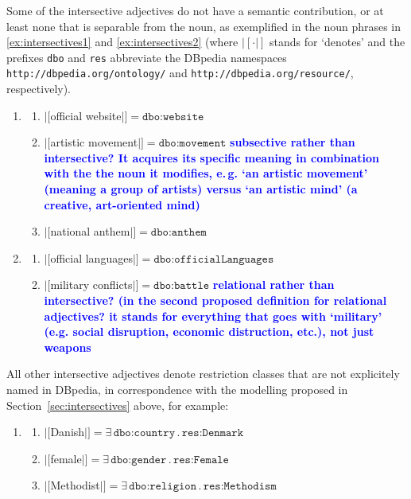 \documentclass[11pt]{article}
\begin{document}
{Some of the intersective adjectives do not have a semantic contribution, or at least none that is separable from the noun, 
as exemplified in the noun phrases in \ref{ex:intersectives1} and \ref{ex:intersectives2} (where $|[\cdot|]$ stands for 
`denotes' and the prefixes \texttt{dbo} and \texttt{res} abbreviate the DBpedia namespaces \texttt{http://dbpedia.org/ontology/} 
and \texttt{http://dbpedia.org/resource/}, respectively).
\begin{enumerate}[resume]
\item \begin{enumerate}
 \item $|[$official website$|]=\texttt{dbo:website}$
 \item $|[$artistic movement$|]=\texttt{dbo:movement}$ \textbf{\textcolor{blue}{subsective rather than intersective? It acquires its specific meaning in combination with the the noun it modifies, e.\,g. `an artistic movement' (meaning a group of artists) versus `an artistic mind' (a creative, art-oriented mind)}}
 \item $|[$national anthem$|]=\texttt{dbo:anthem}$
 \end{enumerate}
 \label{ex:intersectives1}
\item \begin{enumerate}
 \item $|[$official languages$|]=\texttt{dbo:officialLanguages}$
 \item $|[$military conflicts$|]=\texttt{dbo:battle}$ \textbf{\textcolor{blue}{relational rather than intersective? (in the second proposed definition for relational adjectives? it stands for everything that goes with `military' (e.g. social disruption, economic distruction, etc.), not just weapons}}
 \end{enumerate}
 \label{ex:intersectives2}
\end{enumerate}
All other intersective adjectives denote restriction classes that are not explicitely named in DBpedia, 
in correspondence with the modelling proposed in Section~\ref{sec:intersectives} above, for example:
\begin{enumerate}[resume]
\item \begin{enumerate}
 \item $|[$Danish$|]=\exists\,\texttt{dbo:country}\,.\,\texttt{res:Denmark}$
 \item $|[$female$|]=\exists\,\texttt{dbo:gender}\,.\,\texttt{res:Female}$
 \item $|[$Methodist$|]=\exists\,\texttt{dbo:religion}\,.\,\texttt{res:Methodism}$
 \end{enumerate}
\end{enumerate}

}
\end{document}
